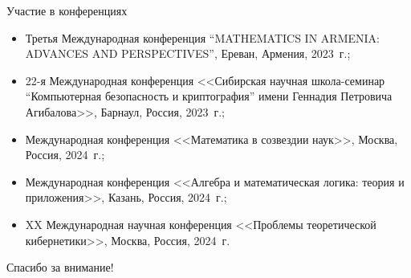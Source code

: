 \begin{frame}{Участие в конференциях}
    \begin{itemize}
        \item Третья Международная конференция ``MATHEMATICS IN ARMENIA: ADVANCES AND PERSPECTIVES'', Ереван, Армения, 2023~г.;
    
        \item 22-я Международная конференция <<Сибирская научная школа-семинар ``Компьютерная безопасность и криптография'' имени Геннадия Петровича Агибалова>>, Барнаул, Россия, 2023~г.;
    
        \item Международная конференция <<Математика в созвездии наук>>, Москва, Россия, 2024~г.;
    
        \item Международная конференция <<Алгебра и математическая логика: теория и приложения>>, Казань, Россия, 2024~г.;
    
        \item XX Международная научная конференция <<Проблемы теоретической кибернетики>>, Москва, Россия, 2024~г.
    \end{itemize}
\end{frame}

\begin{frame} %
    \begin{center}
        \Huge
        Спасибо за внимание!
    \end{center}
\end{frame}
